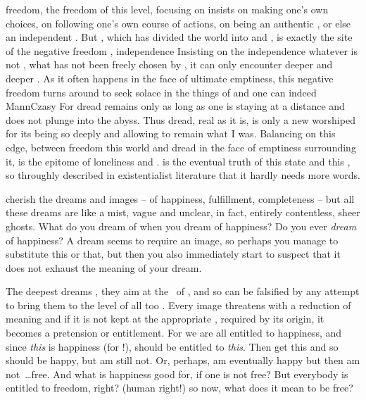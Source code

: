  freedom, the  freedom of this level, focusing on
 insists on making one's own choices, on following one's own course
of actions, on being an authentic , or else an independent
.  But , which has divided the world into
 and , is exactly the site of the negative freedom
, independence   Insisting on the independence  whatever
is not , what has not been freely chosen by , it can only
encounter deeper and deeper .  As it often happens in
the face of ultimate emptiness, this negative freedom turns around to seek
solace in the things of  and one can indeed \citet{ask the
  question if man, following the need of psychological and metaphysical bonds,
  does not prefer dread over freedom.}{MannCzasy}{} For dread
remains only as long as one is staying at a distance and does not plunge into
the abyss. Thus dread, real as it is, is only a new  worshiped for its
being so deeply  and allowing  to remain what I was. Balancing
on this edge, between freedom  this world and dread in the face of
emptiness surrounding it, is the epitome of loneliness and .
 is the eventual truth of this state and
this , so throughly described in existentialist literature that it
hardly needs more words.


\pa %
 cherish the dreams and images -- of happiness, fulfillment, completeness
-- but all these dreams are like a mist, vague and unclear, in fact, entirely
contentless, sheer ghosts. What do you dream of when you dream of happiness? Do
you ever {\em dream} of happiness? A dream seems to require an image, so perhaps you
manage to substitute this or that, but then you also immediately start to
suspect that it does not exhaust the meaning of your dream.

The deepest dreams  , they aim at the \nexus\ of \Yes,
and so can be falsified by any attempt to bring them to the level of all too
. Every image threatens with a reduction of meaning and if it is not
kept at the appropriate , required by its origin, it becomes a
pretension or entitlement. For we are all entitled to happiness, and since {\em
  this} is happiness (for !),  should be entitled to {\em this}.
Then  get this and so  should be happy, but  am still not. Or,
perhaps,  am eventually happy but then  am not~\ldots free. And what is
happiness good for, if one is not free? But everybody is entitled to freedom,
right? (human right!) so now, what does it mean to be free?

